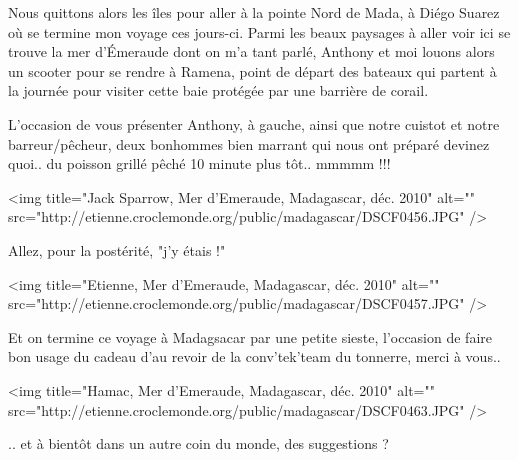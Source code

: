 Nous quittons alors les îles pour aller à la pointe Nord de Mada, à Diégo Suarez où se termine mon voyage ces jours-ci. Parmi les beaux paysages à aller voir ici se trouve la mer d'Émeraude dont on m'a tant parlé, Anthony et moi louons alors un scooter pour se rendre à Ramena, point de départ des bateaux qui partent à la journée pour visiter cette baie protégée par une barrière de corail.

L'occasion de vous présenter Anthony, à gauche, ainsi que notre cuistot et notre barreur/pêcheur, deux bonhommes bien marrant qui nous ont préparé devinez quoi.. du poisson grillé pêché 10 minute plus tôt.. mmmmm !!!

<img title="Jack Sparrow, Mer d'Emeraude, Madagascar, déc. 2010" alt="" src="http://etienne.croclemonde.org/public/madagascar/DSCF0456.JPG" />

Allez, pour la postérité, "j'y étais !"

<img title="Etienne, Mer d'Emeraude, Madagascar, déc. 2010" alt="" src="http://etienne.croclemonde.org/public/madagascar/DSCF0457.JPG" />

Et on termine ce voyage à Madagsacar par une petite sieste, l'occasion de faire bon usage du cadeau d'au revoir de la conv'tek'team du tonnerre, merci à vous..

<img title="Hamac, Mer d'Emeraude, Madagascar, déc. 2010" alt="" src="http://etienne.croclemonde.org/public/madagascar/DSCF0463.JPG" />

.. et à bientôt dans un autre coin du monde, des suggestions ?
